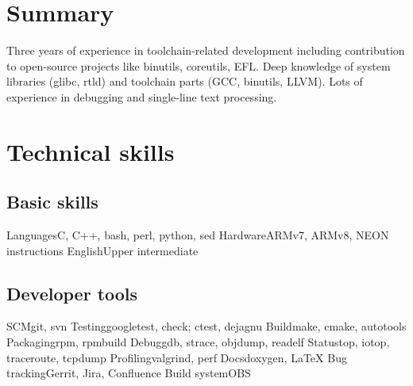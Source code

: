 \documentclass[11pt,a4paper]{moderncv}
\begin{document}
\makecvtitle
\section{Summary}
\cvline
  {}{
Three years of experience in toolchain-related development including
contribution to open-source projects like binutils, coreutils, EFL.
Deep knowledge of system libraries (glibc, rtld) and toolchain parts (GCC, binutils, LLVM).
Lots of experience in debugging and single-line text processing.
}

\section{Technical skills}
\label{sec:skills}
\subsection{Basic skills}
\cvline
  {Languages}{C, C++, bash, perl, python, sed}
\cvline
  {Hardware}{ARMv7, ARMv8, NEON instructions}
\cvline
  {English}{Upper intermediate}
\subsection{Developer tools}
\cvdoubleitem
  {SCM}{git, svn}
  {Testing}{googletest, check; ctest, dejagnu}
\cvdoubleitem
  {Build}{make, cmake, autotools}
  {Packaging}{rpm, rpmbuild}
\cvdoubleitem
  {Debug}{gdb, strace, objdump, readelf}
  {Status}{top, iotop, traceroute, tcpdump}
\cvdoubleitem
  {Profiling}{valgrind, perf}
  {Docs}{doxygen, \LaTeX}
\cvdoubleitem
  {Bug tracking}{Gerrit, Jira, Confluence}
  {Build system}{OBS}
\end{document}
